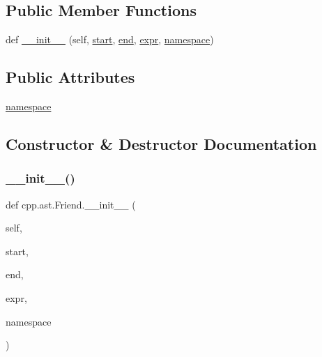 \subsection*{Public Member Functions}
\begin{DoxyCompactItemize}
\item 
def \hyperlink{classcpp_1_1ast_1_1_friend_a9fe245d0f14eaab85435e942a56de7e6}{\+\_\+\+\_\+init\+\_\+\+\_\+} (self, \hyperlink{classcpp_1_1ast_1_1_node_a7b2aa97e6a049bb1a93aea48c48f1f44}{start}, \hyperlink{classcpp_1_1ast_1_1_node_a3c5e5246ccf619df28eca02e29d69647}{end}, \hyperlink{classcpp_1_1ast_1_1_expr_a2f4e13fb0176f2616f8703103c806462}{expr}, \hyperlink{classcpp_1_1ast_1_1_friend_a076c68dddae9bd1e24d224d005538014}{namespace})
\end{DoxyCompactItemize}
\subsection*{Public Attributes}
\begin{DoxyCompactItemize}
\item 
\hyperlink{classcpp_1_1ast_1_1_friend_a076c68dddae9bd1e24d224d005538014}{namespace}
\end{DoxyCompactItemize}


\subsection{Constructor \& Destructor Documentation}
\mbox{\label{classcpp_1_1ast_1_1_friend_a9fe245d0f14eaab85435e942a56de7e6}} 
\subsubsection{\texorpdfstring{\+\_\+\+\_\+init\+\_\+\+\_\+()}{\_\_init\_\_()}}
{\footnotesize\ttfamily def cpp.\+ast.\+Friend.\+\_\+\+\_\+init\+\_\+\+\_\+ (\begin{DoxyParamCaption}\item[{}]{self,  }\item[{}]{start,  }\item[{}]{end,  }\item[{}]{expr,  }\item[{}]{namespace }\end{DoxyParamCaption})}



